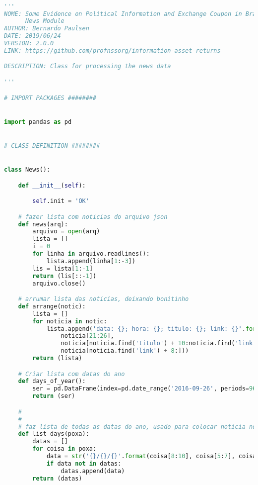 \begin{lstlisting}[language=Python]

'''
NOME: Some Evidence on Political Information and Exchange Coupon in Brazil -
      News Module
AUTHOR: Bernardo Paulsen
DATE: 2019/06/24
VERSION: 2.0.0
LINK: https://github.com/profnssorg/information-asset-returns

DESCRIPTION: Class for processing the news data

'''

# IMPORT PACKAGES ########


import pandas as pd


# CLASS DEFINITION ########


class News():

    def __init__(self):

        self.init = 'OK'

    # fazer lista com noticias do arquivo json
    def news(arq):
        arquivo = open(arq)
        lista = []
        i = 0
        for linha in arquivo.readlines():
            lista.append(linha[1:-3])
        lis = lista[1:-1]
        return (lis[::-1])
        arquivo.close()

    # arrumar lista das noticias, deixando bonitinho
    def arrange(notic):
        lista = []
        for noticia in notic:
            lista.append('data: {}; hora: {}; titulo: {}; link: {}'.format(noticia[10:20],
                noticia[21:26],
                noticia[noticia.find('titulo') + 10:noticia.find('link') - 4],
                noticia[noticia.find('link') + 8:]))
        return (lista)

    # Criar lista com datas do ano
    def days_of_year():
        ser = pd.DataFrame(index=pd.date_range('2016-09-26', periods=964))
        return (ser)

    #
    #
    # faz lista de todas as datas do ano, usado para colocar noticia no dia seguinte
    def list_days(poxa):
        datas = []
        for coisa in poxa:
            data = str('{}/{}/{}'.format(coisa[8:10], coisa[5:7], coisa[:4]))
            if data not in datas:
                datas.append(data)
        return (datas)


\end{lstlisting}
